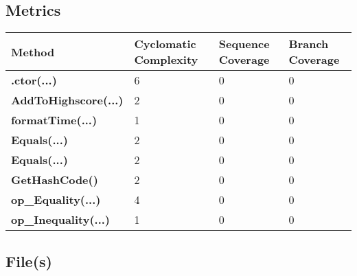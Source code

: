 \documentclass[a4paper,10pt]{article}
\begin{document}
\subsection{Metrics}
\begin{longtable}[l]{|l|l|l|l|}
\hline
\textbf{Method} & \textbf{Cyclomatic Complexity} & \textbf{Sequence Coverage} & \textbf{Branch Coverage}\\
\hline
\textbf{.ctor(...)} & 6 & 0 & 0\\
\hline
\textbf{AddToHighscore(...)} & 2 & 0 & 0\\
\hline
\textbf{formatTime(...)} & 1 & 0 & 0\\
\hline
\textbf{Equals(...)} & 2 & 0 & 0\\
\hline
\textbf{Equals(...)} & 2 & 0 & 0\\
\hline
\textbf{GetHashCode()} & 2 & 0 & 0\\
\hline
\textbf{op\_Equality(...)} & 4 & 0 & 0\\
\hline
\textbf{op\_Inequality(...)} & 1 & 0 & 0\\
\hline
\end{longtable}
\subsection{File(s)}
\end{document}
